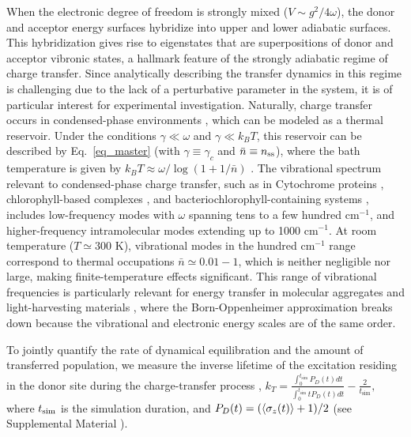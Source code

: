 \documentclass[
reprint,
superscriptaddress,

amsmath,amssymb,
aps,
prl,

floatfix,
]{revtex4-2}
\begin{document}
When the electronic degree of freedom is strongly mixed ($V \sim g^2/4\omega$), the donor and acceptor energy surfaces hybridize into upper and lower adiabatic surfaces. This hybridization gives rise to eigenstates that are superpositions of donor and acceptor vibronic states, a hallmark feature of the strongly adiabatic regime of charge transfer. Since analytically describing the transfer dynamics in this regime is challenging due to the lack of a perturbative parameter in the system, it is of particular interest for experimental investigation. Naturally, charge transfer occurs in condensed-phase environments \cite{kang2024chemical}, which can be modeled as a thermal reservoir. Under the conditions $\gamma \ll \omega$ and $\gamma \ll k_B T$, this reservoir can be described by Eq.~\eqref{eq_master} (with $\gamma\equiv\gamma_c$ and $\bar{n}\equiv n_{\rm ss}$), where the bath temperature is given by $k_B T \approx \omega/\log(1+1/\bar{n})$ \cite{lemmer2018engineering,schlawin2021electrontransfer,so2024electrontransfer}. The vibrational spectrum relevant to condensed-phase charge transfer, such as in Cytochrome proteins \cite{sun2014lowfreq}, chlorophyll-based complexes \cite{ratsep2009chromo}, and bacteriochlorophyll-containing systems \cite{zhang2023pnas}, includes low-frequency modes with $\omega$ spanning tens to a few hundred cm$^{-1}$, and higher-frequency intramolecular modes extending up to 1000 cm$^{-1}$. At room temperature ($T\simeq 300$ K), vibrational modes in the hundred cm$^{-1}$ range correspond to thermal occupations $\bar{n}\simeq0.01-1$, which is neither negligible nor large, making finite-temperature effects significant. This range of vibrational frequencies is particularly relevant for energy transfer in molecular aggregates and light-harvesting materials \cite{fassioli2014vibration}, where the Born-Oppenheimer approximation breaks down because the vibrational and electronic energy scales are of the same order.

To jointly quantify the rate of dynamical equilibration and the amount of transferred population, we measure the inverse lifetime of the excitation residing in the donor site during the charge-transfer process \cite{skourtis1992photosynthesis,schlawin2021electrontransfer,so2024electrontransfer,so2025multimode}, $k_T=\frac{\int_{0}^{t_\text{sim}} P_D(t)dt}{\int_{0}^{t_\text{sim}} t P_D(t)dt} - \frac{2}{t_\text{sim}},$
where $t_{\rm sim}$ is the simulation duration, and $P_D(t)=(\braket{\sigma_z(t)}+1)/2$ \cite{so2024electrontransfer,so2025multimode,padilla2025delocalizedexcitationtransferopen} (see Supplemental Material \cite{so2025fT_supp}).
\end{document}
